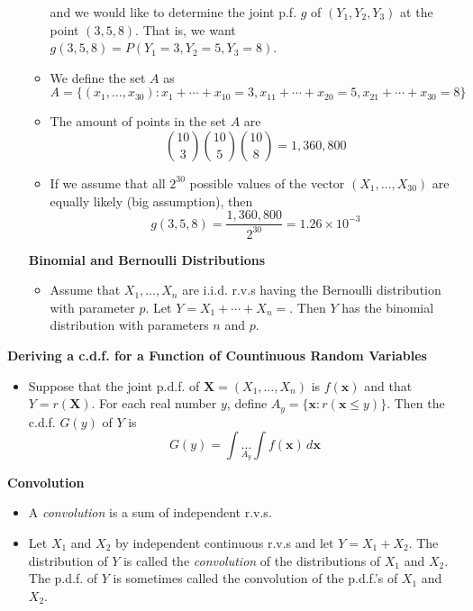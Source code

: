 \documentclass[11pt]{article}
\begin{document}
\begin{itemize}
\begin{itemize}
        and we would like to determine the joint p.f. $g$ of $(Y_1, Y_2, Y_3)$ at the point 
        $(3, 5, 8)$. That is, we want $g(3,5,8)=P(Y_1=3, Y_2=5, Y_3=8)$.

        \item We define the set $A$ as 
        \[ A = \{ (x_1, \ldots, x_{30}): x_1 + \cdots + x_{10} = 3, x_{11} + \cdots + x_{20} = 5
        , x_{21} + \cdots + x_{30} = 8 \} \]

        \item The amount of points in the set $A$ are 
        \[ {10 \choose 3} {10 \choose 5} {10 \choose 8} = 1,360,800 \]

        \item If we assume that all $2^{30}$ possible values of the vector $(X_1, \ldots, 
        X_{30})$ are equally likely (big assumption), then 
        \[ g(3,5,8) = \frac{1,360,800}{2^{30}} = 1.26 \times 10^{-3} \]
    \end{itemize}

    \textbf{Binomial and Bernoulli Distributions}
    \begin{itemize}
        \item Assume that $X_1, \ldots, X_n$ are i.i.d. r.v.s having the Bernoulli 
        distribution with parameter $p$. Let $Y = X_1 + \cdots + X_n =$. Then $Y$ has the 
        binomial distribution with parameters $n$ and $p$.
    \end{itemize}
\end{itemize}

\textbf{Deriving a c.d.f. for a Function of Countinuous Random Variables}
\begin{itemize}
    \item Suppose that the joint p.d.f. of $\boldsymbol{X} = (X_1, \ldots, X_n)$ is 
    $f(\boldsymbol{x})$ and that $Y = r(\boldsymbol{X})$. For each real number $y$, define 
    $A_y = \{ \boldsymbol{x}: r(\boldsymbol{x} \le y) \}$. Then the c.d.f. $G(y)$ of $Y$ is 
    \[ G(y) = \int \underset{A_y}{\ldots} \int f(\boldsymbol{x}) \,d\boldsymbol{x}\]
\end{itemize}

\textbf{Convolution}
\begin{itemize}
    \item A \textit{convolution} is a sum of independent r.v.s.
    \item Let $X_1$ and $X_2$ by independent continuous r.v.s and let $Y=X_1+X_2$. The 
    distribution of $Y$ is called the \textit{convolution} of the distributions of $X_1$ and 
    $X_2$. The p.d.f. of $Y$ is sometimes called the convolution of the p.d.f.'s of $X_1$ and 
    $X_2$.
\end{itemize}
\end{document}
